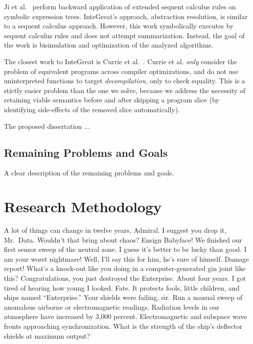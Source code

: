Ji et al.~\cite{transformation} perform backward application of extended sequent calculus rules on symbolic expression trees.
InteGreat's approach, abstraction resolution, is similar to a sequent calculus approach.
However, this work symbolically executes by sequent calculus rules and does not attempt summarization. 
Instead, the goal of the work is bisimulation and optimization of the analyzed algorithms.

The closest work to InteGreat is Currie et al.~\cite{currie2006embedded}. 
Currie et al. \emph{only} consider the problem of equivalent programs across compiler optimizations, and do not use uninterpreted functions to target \emph{decompilation}, only to check equality.
This is a stictly easier problem than the one we solve, because we address the necessity of retaining viable semantics before and after skipping a program slice (by identifying side-effects of the removed slice automatically).

The proposed dissertation ...

\subsection{Remaining Problems and Goals}
A clear description of the remaining problems and goals.

\section{Research Methodology}
\label{sec:methods}
A lot of things can change in twelve years, Admiral. I suggest you drop it, Mr.\ Data. Wouldn't that bring about chaos? Ensign Babyface! We finished our first sensor sweep of the neutral zone. I guess it's better to be lucky than good. I am your worst nightmare! Well, I'll say this for him, he's sure of himself. Damage report! What's a knock-out like you doing in a computer-generated gin joint like this? Congratulations, you just destroyed the Enterprise. About four years. I got tired of hearing how young I looked. Fate. It protects fools, little children, and ships named ``Enterprise.'' Your shields were failing, sir. Run a manual sweep of anomalous airborne or electromagnetic readings. Radiation levels in our atmosphere have increased by 3,000 percent. Electromagnetic and subspace wave fronts approaching synchronization. What is the strength of the ship's deflector shields at maximum output?

